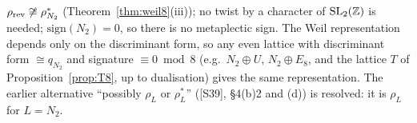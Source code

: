 \begin{remark}\label{rem:twist8}
$\rho_{\rm rev}\not\cong\rho_{N_2}^*$ (Theorem~\ref{thm:weil8}(iii)); no twist by a character of $\mathrm{SL}_2(\mathbb{Z})$ is needed; $\mathrm{sign}(N_2)=0$, so there is no metaplectic sign. The Weil representation depends only on the discriminant form, so any even lattice with discriminant form $\cong q_{N_2}$ and signature $\equiv0\bmod8$ (e.g.\ $N_2\oplus U$, $N_2\oplus E_8$, and the lattice $T$ of Proposition~\ref{prop:T8}, up to dualisation) gives the same representation. The earlier alternative ``possibly $\rho_L$ or $\rho_L^*$'' ([S39], \S4(b)2 and (d)) is resolved: it is $\rho_L$ for $L=N_2$.
\end{remark}

